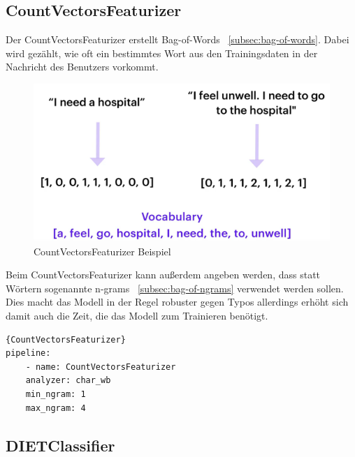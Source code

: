 \subsection{CountVectorsFeaturizer}\label{subsec:count-vectors-featurizer}

Der CountVectorsFeaturizer erstellt Bag-of-Words ~\ref{subsec:bag-of-words}.
Dabei wird gezählt, wie oft ein bestimmtes Wort aus den Trainingsdaten in der Nachricht des Benutzers vorkommt.\cite{countVectorsFeaturizer, pipelineConfigurationVideo, pipelineComponentsYoutube, rasaMasterclassCountVectorsFeaturizer}

\begin{figure}[hbt!]
    \centering
    \includegraphics[scale=0.4]{pics/countvectorsfeaturizer}
    \caption{CountVectorsFeaturizer Beispiel~\cite{pipelineConfigurationVideo}}
    \label{fig:CountVectorsFeaturizer}
\end{figure}

Beim CountVectorsFeaturizer kann außerdem angeben werden, dass statt Wörtern sogenannte n-grams ~\ref{subsec:bag-of-ngrams} verwendet werden sollen.
Dies macht das Modell in der Regel robuster gegen Typos allerdings erhöht sich damit auch die Zeit, die das Modell zum Trainieren benötigt.\cite{countVectorsFeaturizer, pipelineConfigurationVideo, pipelineComponentsYoutube, rasaMasterclassCountVectorsFeaturizer}

\begin{lstlisting}[label={lst:count-vectors-featurizer},caption={CountVectorsFeaturizer}]{CountVectorsFeaturizer}
pipeline:
    - name: CountVectorsFeaturizer
    analyzer: char_wb
    min_ngram: 1
    max_ngram: 4
\end{lstlisting}

\subsection{DIETClassifier}\label{subsec:dietclassifier}

